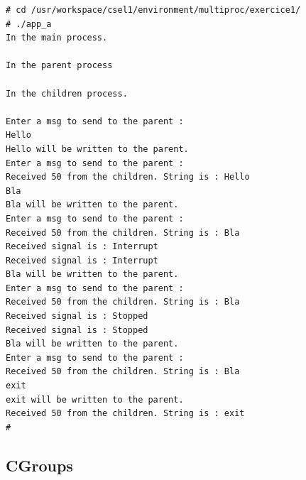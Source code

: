 \begin{lstlisting}
# cd /usr/workspace/csel1/environment/multiproc/exercice1/                      
# ./app_a                                                                       
In the main process.                                                            

In the parent process                                                           

In the children process.                                                        

Enter a msg to send to the parent :                                             
Hello                                                                           
Hello will be written to the parent.                                            
Enter a msg to send to the parent :                                             
Received 50 from the children. String is : Hello                                
Bla                                                                             
Bla will be written to the parent.                                              
Enter a msg to send to the parent :                                             
Received 50 from the children. String is : Bla                                  
Received signal is : Interrupt                                                 
Received signal is : Interrupt                                                  
Bla will be written to the parent.                                              
Enter a msg to send to the parent :                                             
Received 50 from the children. String is : Bla                                  
Received signal is : Stopped                                                    
Received signal is : Stopped                                                    
Bla will be written to the parent.                                              
Enter a msg to send to the parent :                                             
Received 50 from the children. String is : Bla                                  
exit                                                                          
exit will be written to the parent.                                             
Received 50 from the children. String is : exit 
#
\end{lstlisting}

\subsection{CGroups}
